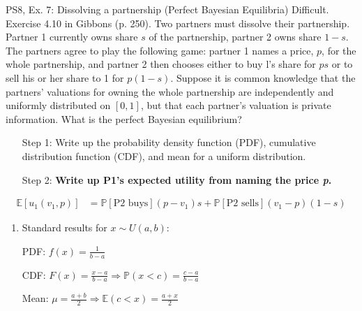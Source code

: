 \begin{frame}{PS8, Ex. 7: Dissolving a partnership (Perfect Bayesian Equilibria)}
    Difficult. Exercise 4.10 in Gibbons (p. 250). Two partners must dissolve their partnership. Partner 1 currently owns share $s$ of the partnership, partner 2 owns share $1-s$. The partners agree to play the following game: partner 1 names a price, $p$, for the whole partnership, and partner 2 then chooses either to buy l's share for $ps$ or to sell his or her share to 1 for $p(1-s)$. Suppose it is common knowledge that the partners' valuations for owning the whole partnership are independently and uniformly distributed on $[0,1]$, but that each partner's valuation is private information. What is the perfect Bayesian equilibrium?\vspace{-8pt}
    \begin{multicols}{2}
      \begin{itemize}
        \item[Step 1:] Write up the probability density function (PDF), cumulative distribution function (CDF), and mean for a uniform distribution.
        \item[Step 2:] \textbf{Write up P1's expected utility from naming the price \textit{p}.}
      \end{itemize} \vspace{-8pt}
      \begin{align*}
          \mathbb{E}[u_1(v_1,p)]
            &=\mathbb{P}[\text{P2 buys}](p-v_1)s+\mathbb{P}[\text{P2 sells}](v_1-p)(1-s)
      \end{align*}
      \vfill\null\columnbreak
      \begin{enumerate}
        \item Standard results for $x\sim U(a, b):$
        \item[PDF:]  $f(x)=\frac{1}{b-a}$
        \item[CDF:]  $F(x)=\frac{x-a}{b-a}\Rightarrow\mathbb{P}(x<c)=\frac{c-a}{b-a}$
        \item[Mean:] $\mu=\frac{a+b}{2}\Rightarrow\mathbb{E}(c<x)=\frac{a+x}{2}$
      \end{enumerate}
      \vfill\null
    \end{multicols}
\end{frame}
